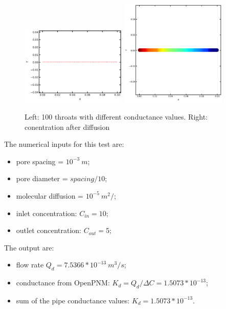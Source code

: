 \documentclass{article}
\begin{document}
\begin{figure}[htbp!]
    \centering
    \includegraphics[width=0.45\textwidth]{images/fromOpenPNM/seriesThroats100.png}
    \hspace{0.05\textwidth} %
    \includegraphics[width=0.45\textwidth]{images/fromOpenPNM/seriesConc100.png}
    \caption{Left: 100 throats with different conductance values. Right: conentration after diffusion}
    \label{fig:Series100}
\end{figure}
The numerical inputs for this test are:
\begin{itemize}
    \item pore spacing = $10^{-3} \: m$;
    \item pore diameter = $spacing/10$;
    \item molecular diffusion = $10^{-5} \: m^2/$;
    \item inlet concentration: $C_{in}=10$;
    \item outlet concentration: $C_{out}=5$;
\end{itemize}
The output are:
\begin{itemize}
    \item flow rate $Q_d = 7.5366*10^{-13} \: m^3/s$;
    \item conductance from OpenPNM: $K_d = Q_d/\Delta C = 1.5073 * 10^{-13}$;
    \item sum of the pipe conductance values: $K_d = 1.5073 * 10^{-13}$.
\end{itemize}
\end{document}
